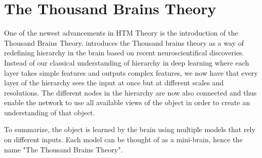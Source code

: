 \section{The Thousand Brains Theory}
One of the newest advancements in HTM Theory is the introduction of the Thousand Brains Theory. \cite{thousandbrains} introduces the Thousand brains theory as a way of redefining hierarchy in the brain based on recent neuroscientifical discoveries. Instead of our classical understanding of hierarchy in deep learning where each layer takes simple features and outputs complex features, we now have that every layer of the hierarchy sees the input at once but at different scales and resolutions. The different nodes in the hierarchy are now also connected and thus enable the network to use all available views of the object in order to create an understanding of that object. \par
To summarize, the object is learned by the brain using multiple models that rely on different inputs. Each model can be thought of as a mini-brain, hence the name "The Thousand Brains Theory".
